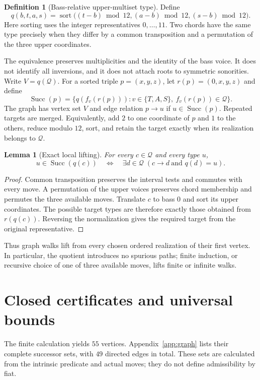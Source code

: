 \documentclass[11pt,letterpaper]{article}
\newtheorem{lemma}[theorem]{Lemma}
\theoremstyle{definition}\newtheorem{definition}[theorem]{Definition}
\newcommand{\Q}{\mathcal Q}
\newcommand{\sort}{\operatorname{sort}}
\newcommand{\Succ}{\operatorname{Succ}}
\begin{document}
\begin{definition}[Bass-relative upper-multiset type]
Define
\[
 q(b,t,a,s)=\sort\bigl((t-b)\bmod12,(a-b)\bmod12,(s-b)\bmod12\bigr).
\]
Here sorting uses the integer representatives $0,\ldots,11$. Two chords have the same type precisely when they differ by a common transposition and a permutation of the three upper coordinates.
\end{definition}
The equivalence preserves multiplicities and the identity of the bass voice. It does not identify all inversions, and it does not attach roots to symmetric sonorities. Write $V=q(\Q)$. For a sorted triple $p=(x,y,z)$, let $r(p)=(0,x,y,z)$ and define
\[
 \Succ(p)=\{q(f_v(r(p))):v\in\{T,A,S\},\ f_v(r(p))\in\Q\}.
\]
The graph has vertex set $V$ and edge relation $p\to u$ if $u\in\Succ(p)$. Repeated targets are merged. Equivalently, add $2$ to one coordinate of $p$ and $1$ to the others, reduce modulo $12$, sort, and retain the target exactly when its realization belongs to $\Q$.

\begin{lemma}[Exact local lifting]\label{lem:lift}
For every $c\in\Q$ and every type $u$,
\[
 u\in\Succ(q(c))\quad\Longleftrightarrow\quad
 \exists d\in\Q\;(c\to d\ \text{and }q(d)=u).
\]
\end{lemma}
\begin{proof}
Common transposition preserves the interval tests and commutes with every move. A permutation of the upper voices preserves chord membership and permutes the three available moves. Translate $c$ to bass $0$ and sort its upper coordinates. The possible target types are therefore exactly those obtained from $r(q(c))$. Reversing the normalization gives the required target from the original representative.
\end{proof}
Thus graph walks lift from every chosen ordered realization of their first vertex. In particular, the quotient introduces no spurious paths; finite induction, or recursive choice of one of three available moves, lifts finite or infinite walks.

\clearpage
\section{Closed certificates and universal bounds}
The finite calculation yields $55$ vertices. Appendix~\ref{app:graph} lists their complete successor sets, with $49$ directed edges in total. These sets are calculated from the intrinsic predicate and actual moves; they do not define admissibility by fiat.
\end{document}
